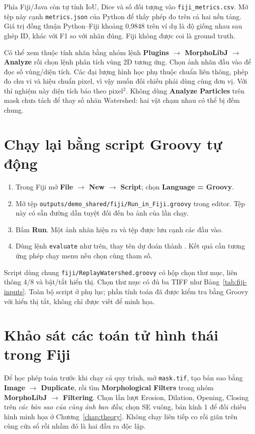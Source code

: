 Phía Fiji/Java còn tự tính IoU, Dice và số đối tượng vào \texttt{fiji\_metrics.csv}. Mở tệp này cạnh \texttt{metrics.json} của Python để thấy phép đo trên cả hai nền tảng. Giá trị đồng thuận Python--Fiji khoảng 0,9848 trên ví dụ là độ giống nhau sau ghép ID, khác với F1 so với nhãn đúng. Fiji không được coi là ground truth.

Có thể xem thuộc tính nhãn bằng nhóm lệnh \textbf{Plugins $\to$ MorphoLibJ $\to$ Analyze} rồi chọn lệnh phân tích vùng 2D tương ứng. Chọn ảnh nhãn đầu vào để đọc số vùng/diện tích. Các đại lượng hình học phụ thuộc chuẩn liên thông, phép đo chu vi và hiệu chuẩn pixel, vì vậy muốn đối chiếu phải dùng cùng đơn vị. Với thí nghiệm này diện tích báo theo pixel$^2$. Không dùng \textbf{Analyze Particles} trên mask chưa tách để thay số nhãn Watershed: hai vật chạm nhau có thể bị đếm chung.

\section{Chạy lại bằng script Groovy tự động}
\begin{enumerate}[leftmargin=*]
\item Trong Fiji mở \textbf{File $\to$ New $\to$ Script}; chọn \textbf{Language = Groovy}.
\item Mở tệp \texttt{outputs/demo\_shared/fiji/Run\_in\_Fiji.groovy} trong editor. Tệp này có sẵn đường dẫn tuyệt đối đến ba ảnh của lần chạy.
\item Bấm \textbf{Run}. Một ảnh nhãn hiện ra và tệp  được lưu cạnh các đầu vào.
\item Dùng lệnh \texttt{evaluate} như trên, thay tên dự đoán thành . Kết quả cần tương ứng phép chạy menu nếu chọn cùng tham số.
\end{enumerate}
Script dùng chung \texttt{fiji/ReplayWatershed.groovy} có hộp chọn thư mục, liên thông 4/8 và bật/tắt hiển thị. Chọn thư mục có đủ ba TIFF như Bảng~\ref{tab:fiji-inputs}. Toàn bộ script ở phụ lục; phần tính toán đã được kiểm tra bằng Groovy với hiển thị tắt, không chỉ được viết để minh họa.

\section{Khảo sát các toán tử hình thái trong Fiji}
Để học phép toán trước khi chạy cả quy trình, mở \texttt{mask.tif}, tạo bản sao bằng \textbf{Image $\to$ Duplicate}, rồi tìm \textbf{Morphological Filters} trong nhóm \textbf{MorphoLibJ $\to$ Filtering}. Chọn lần lượt Erosion, Dilation, Opening, Closing trên \emph{các bản sao của cùng ảnh ban đầu}; chọn SE vuông, bán kính 1 để đối chiếu hình minh họa ở Chương~\ref{chap:theory}. Không chạy liên tiếp co rồi giãn trên cùng cửa sổ rồi nhầm đó là hai đầu ra độc lập.

